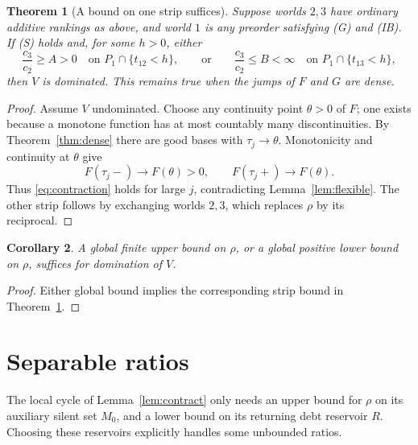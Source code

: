 \documentclass[11pt]{article}
\newtheorem{theorem}{Theorem}
\newtheorem{corollary}[theorem]{Corollary}
\theoremstyle{remark}\newtheorem{remark}[theorem]{Remark}
\begin{document}
\begin{theorem}[A bound on one strip suffices]\label{thm:bounded}
Suppose worlds $2,3$ have ordinary additive rankings as above, and world $1$
is any preorder satisfying (G) and (IB). If (S) holds and, for some
$h>0$, either
\[
 \frac{c_3}{c_2}\ge A>0\quad\text{on }P_1\cap\{t_{12}<h\},
 \qquad\text{or}\qquad
 \frac{c_3}{c_2}\le B<\infty\quad\text{on }P_1\cap\{t_{13}<h\},
\]
then $V$ is dominated. This remains true when the jumps of $F$ and $G$
are dense.
\end{theorem}
\begin{proof}
Assume $V$ undominated. Choose any continuity point $\theta>0$ of $F$;
one exists because a monotone function has at most countably many
discontinuities. By Theorem~\ref{thm:dense} there are good bases with
$\tau_j\to\theta$. Monotonicity and continuity at $\theta$ give
\[
 F(\tau_j-)\longrightarrow F(\theta)>0,
 \qquad F(\tau_j+)\longrightarrow F(\theta).
\]
Thus \eqref{eq:contraction} holds for large $j$, contradicting
Lemma~\ref{lem:flexible}. The other strip follows by exchanging
worlds $2,3$, which replaces $\rho$ by its reciprocal.
\end{proof}

\begin{corollary}\label{cor:onesided}
A global finite upper bound on $\rho$, or a global positive lower bound
on $\rho$, suffices for domination of $V$.
\end{corollary}
\begin{proof}
Either global bound implies the corresponding strip bound in
Theorem~\ref{thm:bounded}.
\end{proof}

\section{Separable ratios}

The local cycle of Lemma~\ref{lem:contract} only needs an upper bound
for $\rho$ on its auxiliary silent set $M_0$, and a lower bound on its
returning debt reservoir $R$. Choosing these reservoirs explicitly handles
some unbounded ratios.
\end{document}
